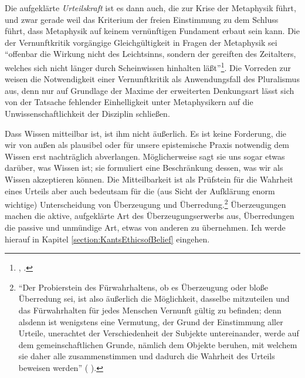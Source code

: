 Die aufgeklärte \emph{Urteilskraft} ist es dann auch, die zur Krise der
Metaphysik führt, und zwar gerade weil das Kriterium der freien Einstimmung zu
dem Schluss führt, dass Metaphysik auf keinem vernünftigen Fundament erbaut sein
kann. Die der Vernunftkritik vorgängige Gleichgültigkeit in Fragen der
Metaphysik sei \enquote{offenbar die Wirkung nicht des Leichtsinns, sondern der
gereiften  des Zeitalters, welches sich nicht länger durch
Scheinwissen hinhalten läßt}\footnote{\cite[][A
xi]{Kant:KritikderreinenVernunft2003}, \cite[][IV:
9.2--4]{Kant:GesammelteWerke1900ff.}.}. Die Vorreden zur  weisen die Notwendigkeit einer Vernunftkritik als
Anwendungsfall des Pluralismus aus, denn nur auf Grundlage der Maxime der
erweiterten Denkungsart lässt sich von der Tatsache fehlender Einhelligkeit
unter Metaphysikern auf die Unwissenschaftlichkeit der Disziplin schließen.

Dass Wissen mitteilbar ist, ist ihm nicht äußerlich. Es ist keine Forderung, die
wir von außen als plausibel oder für unsere epistemische Praxis notwendig dem
Wissen erst nachträglich abverlangen. Möglicherweise sagt sie uns sogar
etwas darüber, was Wissen ist; sie formuliert eine Beschränkung dessen, was wir
als Wissen akzeptieren können. Die Mitteilbarkeit ist als Prüfstein für die
Wahrheit eines Urteils aber auch bedeutsam für die (aus Sicht der Aufklärung
enorm wichtige) Unterscheidung von Überzeugung und Überredung.\footnote{\enquote{Der Probierstein des Fürwahrhaltens, ob es Überzeugung oder bloße Überredung
  sei, ist also äußerlich die Möglichkeit, dasselbe mitzuteilen und das
  Fürwahrhalten für jedes Menschen Vernunft gültig zu befinden; denn alsdenn ist
  wenigstens eine Vermutung, der Grund der Einstimmung aller Urteile, unerachtet
  der Verschiedenheit der Subjekte untereinander, werde auf dem
  gemeinschaftlichen Grunde, nämlich dem Objekte beruhen, mit welchem sie daher
  alle zusammenstimmen und dadurch die Wahrheit des Urteils beweisen
  werden} \mkbibparens{\cite[][B 488\,f.,]{Kant:KritikderreinenVernunft2003}
  \cite[][III: 532.9--16]{Kant:GesammelteWerke1900ff.}}.}
Überzeugungen machen die aktive, aufgeklärte Art des
Überzeugungserwerbs aus, Überredungen die passive und unmündige Art, etwas von
anderen zu übernehmen. Ich werde hierauf in Kapitel
\ref{section:KantsEthicsofBelief} eingehen.

